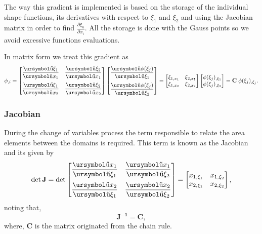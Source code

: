 \documentclass[10pt, a4paper]{article}
\def\urpartial{\mbox{\ursymbol\char"B6}}
\begin{document}
The way this gradient is implemented is based on the storage of the individual shape functions, its derivatives with respect to $\xi_1$ and $\xi_2$ and using the Jacobian matrix in order to find $\frac{\partial \xi_u}{\partial x_i}$. All the storage is done with the Gauss points so we avoid excessive functions evaluations.

In matrix form we treat this gradient as 
\begin{equation*}
\phi_{,i} = \begin{bmatrix}
\dfrac{\urpartial \xi_1}{\urpartial x_1} & \dfrac{\urpartial \xi_2}{\urpartial x_1} \\[0.4cm]
\dfrac{\urpartial \xi_1}{\urpartial x_2} & \dfrac{\urpartial \xi_2}{\urpartial x_2}
\end{bmatrix}\begin{bmatrix}
\dfrac{\urpartial \phi(\xi_j)}{\urpartial \xi_1} \\[0.4cm]
\dfrac{\urpartial \phi(\xi_j)}{\urpartial \xi_2} 
\end{bmatrix} =
\begin{bmatrix}
\xi_{1,x_1} & \xi_{2,x_1} \\
\xi_{1,x_2} & \xi_{2,x_2} \\
\end{bmatrix}
\begin{bmatrix}
\phi(\xi_j)_{,\xi_1} \\
\phi(\xi_j)_{,\xi_2}
\end{bmatrix} =
\mathbf{C} \; \phi(\xi_j)_{,\xi_j} .
\end{equation*}

\subsubsection{Jacobian}

During the change of variables process the term responsible to relate the area elements between the domains is required. This term is known as the Jacobian and its given by
\begin{equation*}
\det \mathbf{J} = \det \begin{bmatrix}
\dfrac{\urpartial x_1}{\urpartial \xi_1} & \dfrac{\urpartial x_1}{\urpartial \xi_2} \\[0.4cm]
\dfrac{\urpartial x_2}{\urpartial \xi_1} & \dfrac{\urpartial x_2}{\urpartial \xi_2} 
\end{bmatrix} =
\begin{bmatrix}
x_{1,\xi_1} & x_{1,\xi_2} \\
x_{2,\xi_1} & x_{2,\xi_2}
\end{bmatrix},
\end{equation*}
noting that,
\begin{equation*}
\mathbf{J^{-1} = C},
\end{equation*}
where, $\mathbf{C}$ is the matrix originated from the chain rule.
\end{document}
